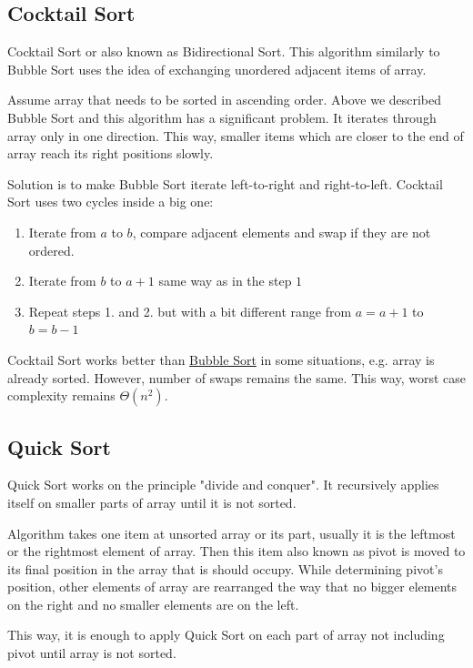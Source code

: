 \documentclass[
  field=inf,
  biblatex,
  language=english,
  glossaries,
  index
]{kidiplom}
\begin{document}
\subsection{Cocktail Sort}

Cocktail Sort or also known as Bidirectional Sort. This algorithm similarly to Bubble Sort uses the idea of exchanging unordered adjacent items of array. 

Assume array that needs to be sorted in ascending order. Above we described Bubble Sort and this algorithm has a significant problem. It iterates through array only in one direction. This way, smaller items which are closer to the end of array reach its right positions slowly.

Solution is to make Bubble Sort iterate left-to-right and right-to-left. Cocktail Sort uses two cycles inside a big one:

\begin{enumerate}
 \item Iterate from $a$ to $b$, compare adjacent elements and swap if they are not ordered.
 \item Iterate from $b$ to $a + 1$ same way as in the step $1$
 \item Repeat steps 1. and 2. but with a bit different range from $a = a + 1$ to $b = b - 1$
\end{enumerate}

Cocktail Sort works better than \hyperref[sec:bubble]{Bubble Sort} in some situations, e.g. array is already sorted. However, number of swaps remains the same. This way, worst case complexity remains $\Theta(n^2)$.

\subsection{Quick Sort}

Quick Sort works on the principle "divide and conquer". It recursively applies itself on smaller parts of array until it is not sorted.

Algorithm takes one item at unsorted array or its part, usually it is the leftmost or the rightmost element of array. Then this item also known as pivot is moved to its final position in the array that is should occupy. While determining pivot's position, other elements of array are rearranged the way that no bigger elements on the right and no smaller elements are on the left.

This way, it is enough to apply Quick Sort on each part of array not including pivot until array is not sorted.
\end{document}
